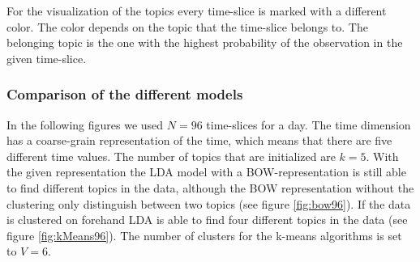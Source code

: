 \documentclass[11pt,a4paper]{article}
\begin{document}
For the visualization of the topics every time-slice is marked with a different color. The color depends on the topic that the time-slice belongs to. The belonging topic is the one with the highest probability of the observation in the given time-slice.



\subsubsection{Comparison of the different models}
In the following figures we used $N=96$ time-slices for a day. The time dimension has a coarse-grain representation of the time, which means that there are five different time values. The number of topics that are initialized are $k=5$.
With the given representation the LDA model with a BOW-representation is still able to find different topics in the data, although the BOW representation without the clustering only distinguish between two topics (see figure \ref{fig:bow96}). If the data is clustered on forehand LDA is able to find four different topics in the data (see figure \ref{fig:kMeans96}). The number of clusters for the k-means algorithms is set to $V=6$.
\end{document}
